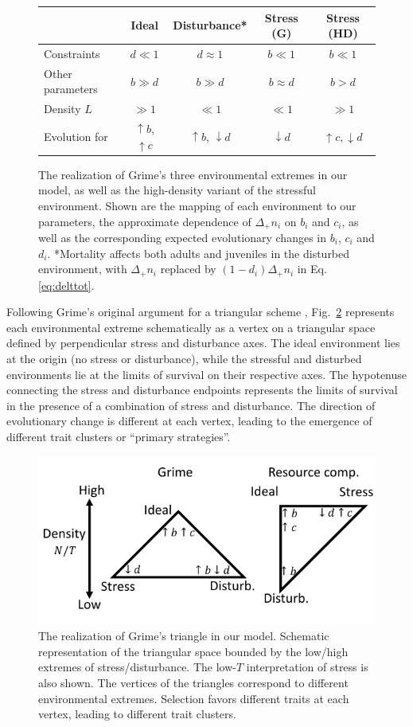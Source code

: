 \documentclass[11pt]{article}
\begin{document}
\begin{figure}
\centering
\begin{tabular}{l*{4}{c}}
  & Ideal & Disturbance* & Stress (G) & Stress (HD) \\ \hline
  Constraints & $d \ll 1$ & $d \approx 1$ & $b \ll 1$ & $b \ll 1$ \\
  Other parameters & $b\gg d$ & $b\gg d$ & $b\approx d$ & $b>d$ \\
  Density $L$  & $\gg 1$ & $\ll 1$ & $\ll 1$ & $\gg 1$ \\
  Evolution for & $\uparrow b$, $ \uparrow c$ & $\uparrow b$, $\downarrow d$ & $\downarrow d$ & $\uparrow c, \downarrow d$
\end{tabular}
\caption{\label{fig:table} The realization of Grime's three environmental extremes in our model, as well as the high-density variant of the stressful environment. Shown are the mapping of each environment to our parameters, the approximate dependence of $\Delta_+ n_i$ on $b_i$ and $c_i$, as well as the corresponding expected evolutionary changes in $b_i$, $c_i$ and $d_i$. *Mortality affects both adults and juveniles in the disturbed environment, with $\Delta_+ n_i$ replaced by $(1-d_i)\Delta_+ n_i$ in Eq. \eqref{eq:delttot}.}
\end{figure}

Following Grime's original argument for a triangular scheme \citep{grime_1977}, Fig.~\ref{fig:axes} represents each environmental extreme schematically as a vertex on a triangular space defined by perpendicular stress and disturbance axes. The ideal environment lies at the origin (no stress or disturbance), while the stressful and disturbed environments lie at the limits of survival on their respective axes. The hypotenuse connecting the stress and disturbance endpoints represents the limits of survival in the presence of a combination of stress and disturbance. The direction of evolutionary change is different at each vertex, leading to the emergence of different trait clusters or ``primary strategies''. 

\begin{figure}
\centering
\includegraphics[scale=1]{axes.pdf}
\caption{\label{fig:axes} The realization of Grime's triangle in our model. Schematic representation of the triangular space bounded by the low/high extremes of stress/disturbance. The low-$T$ interpretation of stress is also shown. The vertices of the triangles correspond to different environmental extremes. Selection favors different traits at each vertex, leading to different trait clusters.} 
\end{figure}
\end{document}
